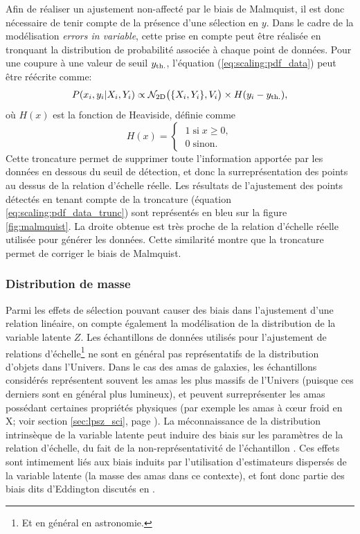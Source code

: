 Afin de réaliser un ajustement non-affecté par le biais de Malmquist, il est donc nécessaire de tenir compte de la présence d'une sélection en $y$.
Dans le cadre de la modélisation \textit{errors in variable}, cette prise en compte peut être réalisée en tronquant la distribution de probabilité associée à chaque point de données.
Pour une coupure à une valeur de seuil $y_{\rm th.}$, l'équation (\ref{eq:scaling:pdf_data}) peut être réécrite comme:
\begin{equation}
    \label{eq:scaling:pdf_data_trunc}
    P(x_i, y_i | X_i, Y_i) \propto \mathcal{N}_{\rm 2D}\big(\{X_i, Y_i\}, V_i\big) \times H(y_i - y_{\rm th.}),
\end{equation}
où $H(x)$ est la fonction de Heaviside, définie comme
\begin{equation}
    H(x) =
        \begin{cases}
            \; 1 \;\text{si}\; x \geqslant 0, \\
            \; 0 \;\text{sinon.}
        \end{cases}
\end{equation}
Cette troncature permet de supprimer toute l'information apportée par les données en dessous du seuil de détection, et donc la surreprésentation des points au dessus de la relation d'échelle réelle.
Les résultats de l'ajustement des points détectés en tenant compte de la troncature (équation \ref{eq:scaling:pdf_data_trunc}) sont représentés en bleu sur la figure \ref{fig:malmquist}.
La droite obtenue est très proche de la relation d'échelle réelle utilisée pour générer les données.
Cette similarité montre que la troncature permet de corriger le biais de Malmquist.

\subsubsection{Distribution de masse} %

Parmi les effets de sélection pouvant causer des biais dans l'ajustement d'une relation linéaire, on compte également la modélisation de la distribution de la variable latente $Z$.
Les échantillons de données utilisés pour l'ajustement de relations d'échelle\footnote{Et en général en astronomie.} ne sont en général pas représentatifs de la distribution d'objets dans l'Univers.
Dans le cas des amas de galaxies, les échantillons considérés représentent souvent les amas les plus massifs de l'Univers (puisque ces derniers sont en général plus lumineux), et peuvent surreprésenter les amas possédant certaines propriétés physiques (par exemple les amas à cœur froid en X; voir section \ref{sec:lpsz_sci}, page \pageref{sec:lpsz_sci}).
La méconnaissance de la distribution intrinsèque de la variable latente peut induire des biais sur les paramètres de la relation d'échelle, du fait de la non-représentativité de l'échantillon \cite{kelly_aspects_2007}.
Ces effets sont intimement liés aux biais induits par l'utilisation d'estimateurs dispersés de la variable latente (la masse des amas dans ce contexte), et font donc partie des biais dits d'Eddington discutés en  \cite{eddington_formula_1913,eddington_correction_1940}.

